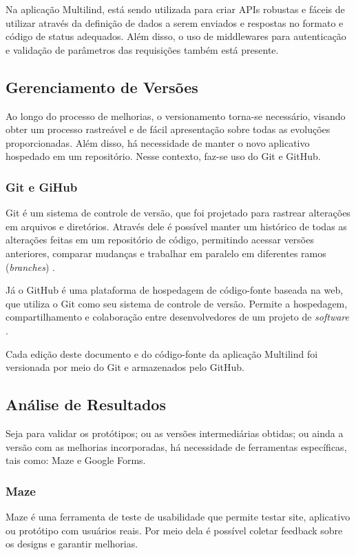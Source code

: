 Na aplicação Multilind, está sendo utilizada para criar APIs robustas e fáceis de utilizar através da definição de dados a serem enviados e respostas 
no formato e código de status adequados. Além disso, o uso de middlewares para autenticação e validação de parâmetros das requisições também está presente.

\subsection{Gerenciamento de Versões}
\label{sec:Gerenciamento de Versões}
Ao longo do processo de melhorias, o versionamento torna-se necessário, visando obter um processo rastreável e de fácil apresentação sobre todas as evoluções 
proporcionadas. Além disso, há necessidade de manter o novo aplicativo hospedado em um repositório. Nesse contexto, faz-se uso do Git e GitHub.

\subsubsection{Git e GiHub}
\label{sec:Git e GiHub}
Git é um sistema de controle de versão, que foi projetado para rastrear alterações em arquivos e diretórios. Através dele é 
possível manter um histórico de todas as alterações feitas em um repositório de código, permitindo acessar versões anteriores, 
comparar mudanças e trabalhar em paralelo em diferentes ramos (\textit{branches}) \cite{git}.

Já o GitHub é uma plataforma de hospedagem de código-fonte baseada na web, que utiliza o Git como seu sistema de controle de 
versão. Permite a hospedagem, compartilhamento e colaboração entre desenvolvedores de um projeto de \textit{software} \cite{github}.

Cada edição deste documento e do código-fonte da aplicação Multilind foi versionada por meio do Git e armazenados pelo GitHub. 

\subsection{Análise de Resultados}
\label{sec:Análise de Resultados}
Seja para validar os protótipos; ou as versões intermediárias obtidas; ou ainda a versão com as melhorias incorporadas, há necessidade de ferramentas específicas, 
tais como: Maze e Google Forms.

\subsubsection{Maze}
\label{sec:Maze}
Maze é uma ferramenta de teste de usabilidade que permite testar site, aplicativo ou protótipo com usuários reais. Por meio dela é possível coletar feedback sobre 
os designs e garantir melhorias.

